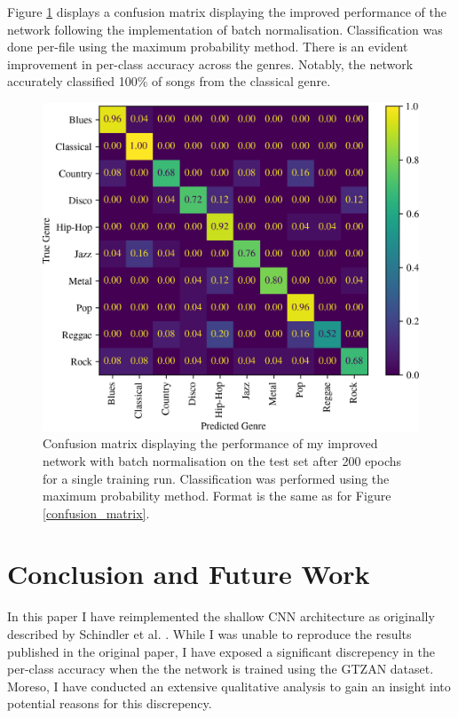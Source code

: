 \documentclass[conference]{IEEEtran}
\begin{document}
Figure \ref{confusion_matrix_improved} displays a confusion matrix displaying the improved performance of the network following the implementation of batch normalisation.
Classification was done per-file using the maximum probability method.
There is an evident improvement in per-class accuracy across the genres.
Notably, the network accurately classified 100\% of songs from the classical genre.

\begin{figure}[htbp]
    \centerline{\includegraphics[width=\columnwidth]{cm_improved.png}}
    \caption{
        Confusion matrix displaying the performance of my improved network with batch normalisation on the test set after 200 epochs for a single training run.
        Classification was performed using the maximum probability method.
        Format is the same as for Figure \ref{confusion_matrix}.
    }
    \label{confusion_matrix_improved}
\end{figure}

\section{Conclusion and Future Work}

In this paper I have reimplemented the shallow CNN architecture as originally described by Schindler et al. \cite{SchindlerLidyRauber}.
While I was unable to reproduce the results published in the original paper, I have exposed a significant discrepency in the per-class accuracy when the the network is trained using the GTZAN dataset.
Moreso, I have conducted an extensive qualitative analysis to gain an insight into potential reasons for this discrepency.
\end{document}
